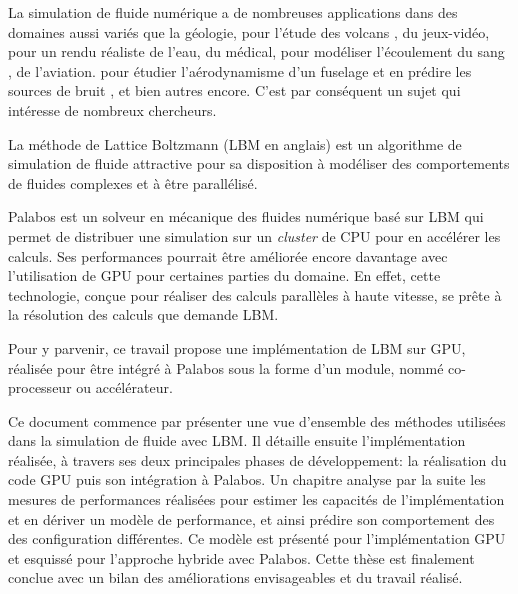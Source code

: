 La simulation de fluide numérique a de nombreuses applications dans des domaines aussi variés que la géologie, pour l'étude des volcans \cite{brogi_lattice_2017}, du jeux-vidéo, pour un rendu réaliste de l'eau, du médical, pour modéliser l'écoulement du sang \cite{hirabayashi_lattice_2004}, de l'aviation. pour étudier l'aérodynamisme d'un fuselage et en prédire les sources de bruit \cite{lew_noise_2010}, et bien autres encore. C'est par conséquent un sujet qui intéresse de nombreux chercheurs.

La méthode de Lattice Boltzmann (\acf{LBM} en anglais) est un algorithme de simulation de fluide attractive pour sa disposition à modéliser des comportements de fluides complexes et à être parallélisé.

Palabos est un solveur en mécanique des fluides numérique basé sur \acs{LBM} qui permet de distribuer une simulation sur un \textit{cluster} de \acs{CPU} pour en accélérer les calculs. Ses performances pourrait être améliorée encore davantage avec l'utilisation de \acs{GPU} pour certaines parties du domaine. En effet, cette technologie, conçue pour réaliser des calculs parallèles à haute vitesse, se prête à la résolution des calculs que demande \acs{LBM}.

Pour y parvenir, ce travail propose une implémentation de \acs{LBM} sur \acs{GPU}, réalisée pour être intégré à Palabos sous la forme d'un module, nommé co-processeur ou accélérateur.

Ce document commence par présenter une vue d'ensemble des méthodes utilisées dans la simulation de fluide avec \acs{LBM}. Il détaille ensuite l'implémentation réalisée, à travers ses deux principales phases de développement: la réalisation du code \acs{GPU} puis son intégration à Palabos.
Un chapitre analyse par la suite les mesures de performances réalisées pour estimer les capacités de l'implémentation et en dériver un modèle de performance, et ainsi prédire son comportement des des configuration différentes. Ce modèle est présenté pour l'implémentation \acs{GPU} et esquissé pour l'approche hybride avec Palabos.
Cette thèse est finalement conclue avec un bilan des améliorations envisageables et du travail réalisé.
